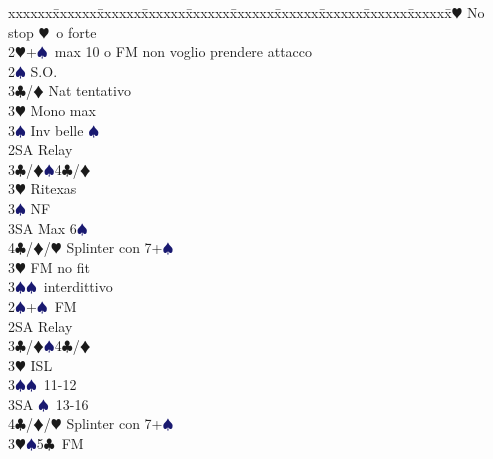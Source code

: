 \documentclass[a4paper,italian]{article}
\newcommand{\BC}{\textcolor{OliveGreen}{$\clubsuit$}}
\newcommand{\BD}{\textcolor{RedOrange}{$\vardiamondsuit$}}
\newcommand{\BH}{\textcolor{Red2}{$\varheartsuit${}}}
\newcommand{\BS}{\textcolor{MidnightBlue}{$\spadesuit${}}}
\newenvironment{bidtable}
{\begin{tabbing}

    xxxxxx\=xxxxxx\=xxxxxx\=xxxxxx\=xxxxxx\=xxxxxx\=xxxxxx\=xxxxxx\=xxxxxx\=xxxxxx\=\kill}
{\end{tabbing} }%
\begin{document}
\begin{multicols*}{2}
\begin{bidtable}
        2\BH \> No stop \BH\ o forte\-\\
        2\BH {}+\BS\ max 10 o FM non voglio prendere attacco\+\\
        2\BS \> S.O.\+\\
        3\BC/\BD \> Nat tentativo\\
        3\BH \> Mono max\\
        3\BS \> Inv belle \BS \-\\
        2SA \> Relay\+\\
        3\BC/\BD {}\BS 4\BC /\BD \\
        3\BH \> Ritexas\+\\
        3\BS \> NF\-\\
        3SA \> Max 6\BS \\
        4\BC/\BD/\BH \> Splinter con 7+\BS \-\\
        3\BH \> FM no fit\\
        3\BS {}\BS\ interdittivo\-\\
        2\BS {}+\BS\ FM\+\\
        2SA \> Relay\+\\
        3\BC/\BD {}\BS 4\BC /\BD \\
        3\BH \> ISL\\
        3\BS {}\BS\ 11-12\\
        3SA \BS\ 13-16\\
        4\BC/\BD/\BH \> Splinter con 7+\BS \-\-\\
        3\BH {}\BS 5\BC\ FM
    \end{bidtable}

    \vfill
    \parbox{\textwidth}{}

    \columnbreak


\end{multicols*}
\end{document}
